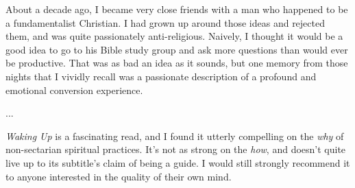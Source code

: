 \documentclass[a4paper, 12pt]{article}
\title{}
\author{Brendon J. Brewer}
\begin{document}
\sffamily
\maketitle

About a decade ago, I became very close friends with a man who happened to be
a fundamentalist Christian. I had grown up around those ideas and rejected
them, and was quite passionately anti-religious. Naively, I thought it would be
a good idea to go to his Bible study group and ask more questions than would
ever be productive. That was as bad an idea as it sounds, but one memory from
those nights that I vividly recall was a passionate description of a
profound and emotional conversion experience.

...


{\em Waking Up} is a fascinating read, and I found it utterly
compelling on the {\em why} of non-sectarian spiritual practices. It's not as
strong on the {\em how}, and doesn't quite live up to its subtitle's claim of
being a guide. I would still strongly recommend it to anyone interested in
the quality of their own mind.
\end{document}
